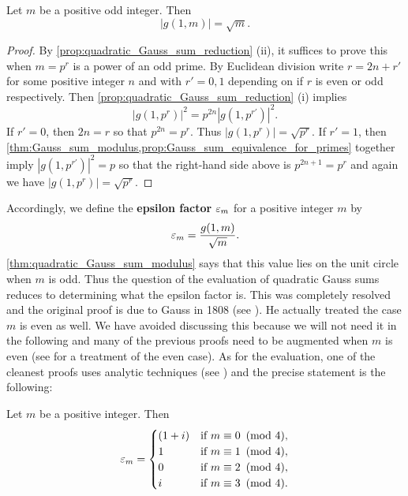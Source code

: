        \begin{theorem}\label{thm:quadratic_Gauss_sum_modulus}
          Let $m$ be a positive odd integer. Then
          \[
            |g(1,m)| = \sqrt{m}.
          \]
        \end{theorem}
        \begin{proof}
          By \cref{prop:quadratic_Gauss_sum_reduction} (ii), it suffices to prove this when $m = p^{r}$ is a power of an odd prime. By Euclidean division write $r = 2n+r'$ for some positive integer $n$ and with $r' = 0,1$ depending on if $r$ is even or odd respectively. Then \cref{prop:quadratic_Gauss_sum_reduction} (i) implies
          \[
            |g(1,p^{r})|^{2} = p^{2n}|g(1,p^{r'})|^{2}.
          \]
          If $r' = 0$, then $2n = r$ so that $p^{2n} = p^{r}$. Thus $|g(1,p^{r})| = \sqrt{p^{r}}$. If $r' = 1$, then \cref{thm:Gauss_sum_modulus,prop:Gauss_sum_equivalence_for_primes} together imply $|g(1,p^{r'})|^{2} = p$ so that the right-hand side above is $p^{2n+1} = p^{r}$ and again we have $|g(1,p^{r})| = \sqrt{p^{r}}$.
        \end{proof}

        Accordingly, we define the \textbf{epsilon factor} $\varepsilon_{m}$ for a positive integer $m$ by
        \[
          \varepsilon_{m} = \frac{g(1,m)}{\sqrt{m}}.
        \]
        \cref{thm:quadratic_Gauss_sum_modulus} says that this value lies on the unit circle when $m$ is odd. Thus the question of the evaluation of quadratic Gauss sums reduces to determining what the epsilon factor is. This was completely resolved and the original proof is due to Gauss in 1808 (see \cite{Gauss1808summatio}). He actually treated the case $m$ is even as well. We have avoided discussing this because we will not need it in the following and many of the previous proofs need to be augmented when $m$ is even (see \cite{lang1994algebraic} for a treatment of the even case). As for the evaluation, one of the cleanest proofs uses analytic techniques (see \cite{lang1994algebraic}) and the precise statement is the following:

        \begin{theorem}\label{thm:Gauss's_evaluation}
          Let $m$ be a positive integer. Then
          \[
            \varepsilon_{m} = \begin{cases} (1+i) & \text{if $m \equiv 0 \ \left(\text{mod }4\right)$}, \\ 1 & \text{if $m \equiv 1 \ \left(\text{mod }4\right)$}, \\ 0 & \text{if $m \equiv 2 \ \left(\text{mod }4\right)$}, \\ i & \text{if $m \equiv 3 \ \left(\text{mod }4\right)$}. \end{cases}
          \]
        \end{theorem}

